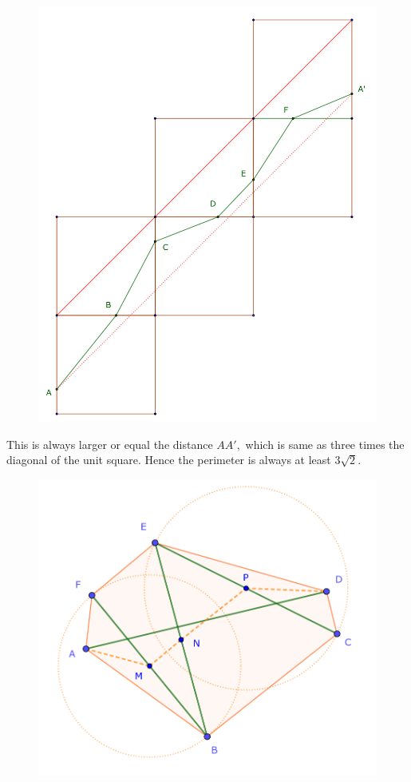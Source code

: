 \begin{multicols}{2}
\begin{figure}[H]
		\includegraphics[width= 0.9\linewidth]{pi-2023-02-02.pdf}
		\vspace*{-5pt}
	\end{figure}
	This is always larger or equal the distance $AA',$ which is same as three times the diagonal of the unit square.
	Hence the perimeter is always at least ${3\sqrt{2}}.$
	\vskip 0.2cm
	\vskip 0.2cm
	\begin{figure}[H]
		\vspace*{-5pt}
		\centering
		\captionsetup{labelformat= empty, justification=centering}
		\includegraphics[width= 1\linewidth]{pi-2023-02-03.pdf}

\end{figure}
\end{multicols}
